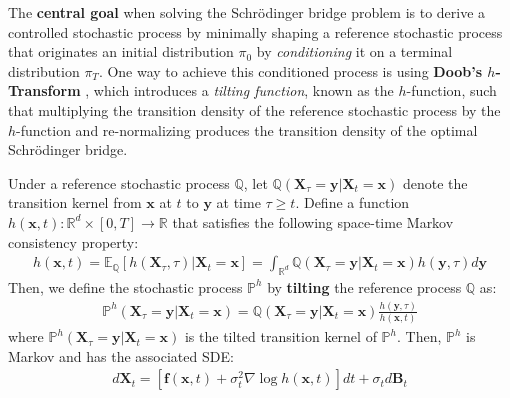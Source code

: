 \documentclass{article}
\newcommand{\boldtext}[1]{\textbf{\textcolor{MyGreen}{#1}}}
\begin{document}
The \textbf{central goal} when solving the Schrödinger bridge problem is to derive a controlled stochastic process by minimally shaping a reference stochastic process that originates an initial distribution $\pi_0$ by \textit{conditioning} it on a terminal distribution $\pi_T$. One way to achieve this conditioned process is using \boldtext{Doob's $h$-Transform} \citep{rogers2000diffusions, sarkka2019applied}, which introduces a \textit{tilting function}, known as the $h$-function, such that multiplying the transition density of the reference stochastic process by the $h$-function and re-normalizing produces the transition density of the optimal Schrödinger bridge.

\begin{proposition}\label{prop:doob-h}
    Under a reference stochastic process $\mathbb{Q}$, let $\mathbb{Q}(\boldsymbol{X}_{\tau}=\boldsymbol{y}|\boldsymbol{X}_t=\boldsymbol{x})$ denote the transition kernel from $\boldsymbol{x}$ at $t$ to $\boldsymbol{y}$ at time $\tau \geq t$. Define a function $h(\boldsymbol{x},t):\mathbb{R}^d\times [0,T] \to \mathbb{R}$ that satisfies the following space-time Markov consistency property:
    \begin{align}
        h(\boldsymbol{x},t)=\mathbb{E}_{\mathbb{Q}}[h(\boldsymbol{X}_\tau,\tau)|\boldsymbol{X}_t=\boldsymbol{x}]=\int_{\mathbb{R}^d}\mathbb{Q}(\boldsymbol{X}_{\tau}=\boldsymbol{y}|\boldsymbol{X}_t=\boldsymbol{x})h(\boldsymbol{y},\tau )d\boldsymbol{y}\tag{$h$-Function}\label{eq:doob-h-function}
    \end{align}
    Then, we define the stochastic process $\mathbb{P}^h$ by \textbf{tilting}  the reference process $\mathbb{Q}$ as:
    \begin{align}
        \mathbb{P}^h(\boldsymbol{X}_{\tau }=\boldsymbol{y}|\boldsymbol{X}_t=\boldsymbol{x})=\mathbb{Q}(\boldsymbol{X}_{\tau}=\boldsymbol{y}|\boldsymbol{X}_t=\boldsymbol{x})\frac{h(\boldsymbol{y},\tau )}{h(\boldsymbol{x},t)}\tag{Doob's $h$-Transform}\label{eq:doob-h-eq1}
    \end{align}
    where $\mathbb{P}^h(\boldsymbol{X}_{\tau }=\boldsymbol{y}|\boldsymbol{X}_t=\boldsymbol{x})$ is the tilted transition kernel of $\mathbb{P}^h$. Then, $\mathbb{P}^h$ is Markov and has the associated SDE:
    \begin{align}
        d\boldsymbol{X}_t=\left[\boldsymbol{f}(\boldsymbol{x},t)+\sigma_t^2\nabla\log h (\boldsymbol{x},t)\right]dt+\sigma_td\boldsymbol{B}_t\tag{Doob's $h$-Transform SDE}\label{eq:doob-h-sde}
    \end{align}
\end{proposition}
\end{document}
